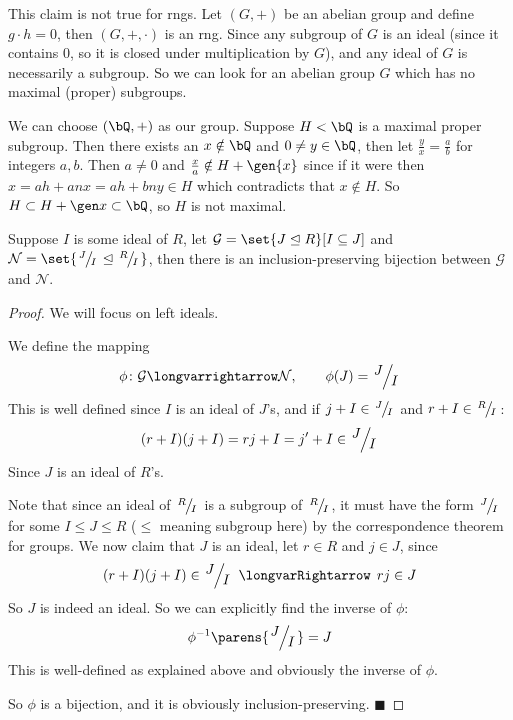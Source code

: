 \documentclass[10pt]{article}
\def\implies{\,\mathrel{\longvarRightarrow}\,}
\let\ideal=\trianglelefteq
\let\longto=\longvarrightarrow
\def\qed{\hskip1cm\hbox{}\hfill$\blacksquare$}
\def\mN{\mathcal N}
\def\mG{\mathcal G}
\begin{document}
\begin{exam*}

    This claim is not true for rngs.
    Let $(G,+)$ be an abelian group and define $g\cdot h=0$, then $(G,+,\cdot)$ is an rng.
    Since any subgroup of $G$ is an ideal (since it contains $0$, so it is closed under multiplication by $G$), and any ideal of $G$ is necessarily a subgroup.
    So we can look for an abelian group $G$ which has no maximal (proper) subgroups.

    We can choose $(\bQ, +)$ as our group.
    Suppose $H<\bQ$ is a maximal proper subgroup.
    Then there exists an $x\notin\bQ$ and $0\neq y\in\bQ$, then let $\frac yx=\frac ab$ for integers $a,b$.
    Then $a\neq0$ and $\frac xa\notin H+\gen{x}$ since if it were then $x=ah+anx=ah+bny\in H$ which contradicts that $x\notin H$.
    So $H\subset H+\gen x\subset\bQ$, so $H$ is not maximal.

\end{exam*}

\begin{thrm*}

    Suppose $I$ is some ideal of $R$, let $\mG=\set{J\ideal R}[I\subseteq J]$ and $\mN=\set{\slfrac JI\ideal\slfrac RI}$, then there is an inclusion-preserving bijection between $\mG$ and $\mN$.

\end{thrm*}

\begin{proof}

    We will focus on left ideals.

    We define the mapping
    \[ \phi\colon\mG\longto\mN,\qquad \phi(J) = \slfrac JI \]
    This is well defined since $I$ is an ideal of $J$'s, and if $j+I\in\slfrac JI$ and $r+I\in\slfrac RI$:
    \[ (r+I)(j+I) = rj + I = j' + I \in \slfrac JI \]
    Since $J$ is an ideal of $R$'s.

    Note that since an ideal of $\slfrac RI$ is a subgroup of $\slfrac RI$, it must have the form $\slfrac JI$ for some $I\leq J\leq R$ ($\leq$ meaning subgroup here) by the correspondence theorem for
    groups.
    We now claim that $J$ is an ideal, let $r\in R$ and $j\in J$, since
    \[ (r+I)(j+I) \in \slfrac JI \implies rj \in J \]
    So $J$ is indeed an ideal.
    So we can explicitly find the inverse of $\phi$:
    \[ \phi^{-1}\parens{\slfrac JI} = J \]
    This is well-defined as explained above and obviously the inverse of $\phi$.

    So $\phi$ is a bijection, and it is obviously inclusion-preserving.
    \qed

\end{proof}
\end{document}
